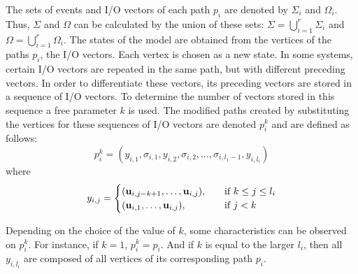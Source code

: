 The sets of events and I\slash O vectors of each path $p_i$ are denoted by $\Sigma_i$
and $\Omega_i$. Thus, $\Sigma$ and $\Omega$ can be calculated by the union of
these sets: $\Sigma=\bigcup_{i=1}^r\Sigma_i$ and
$\Omega=\bigcup_{i=1}^r\Omega_i$.
The states of the model are obtained from the vertices of the paths $p_i$, the I\slash O vectors.
Each vertex is chosen as a new state.
In some systems, certain I\slash O vectors are repeated in the same path, but with different preceding vectors.
In order to differentiate these vectors, its preceding vectors are stored in a sequence of I\slash O vectors.
To determine the number of vectors stored in this sequence a free parameter $k$ is used. 
The modified paths created by substituting the vertices for these sequences of I\slash O vectors are denoted $p_i^k$ and are defined as follows:
\begin{equation}
  \label{eq:modifiedPath}
 p_i^k= (y_{i,1},\sigma_{i,1},y_{i,2},\sigma_{i,2},\dots,\sigma_{i,l_1-1},y_{i,l_i}) 
\end{equation}
where 
\begin{equation}
  \label{eq:modifiedPathb}
y_{i,j}=\begin{cases}
    (\mathbf{u}_{i,j-k+1},\dots,\mathbf{u}_{i,j}),& \quad \text{if } k\leq j\leq l_i\\
    (\mathbf{u}_{i,1},\dots,\mathbf{u}_{i,j}),  & \quad \text{if } j<k
  \end{cases}
\end{equation}
\newline
\begin{observation}
Depending on the choice of the value of $k$, some characteristics can be
observed on $p_i^k$. For instance, if $k=1$, $p_i^k=p_i$. And if $k$ is equal to
the larger $l_i$, then all $y_{i,l_i}$ are composed of all vertices of its
corresponding path $p_i$.
\end{observation}

